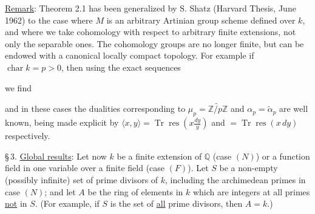 \uline{Remark}: Theorem 2.1 has been generalized by S. Shatz (Harvard Thesis, June 1962) to the case where $M$ is an arbitrary Artinian  group scheme defined over $k$, and where we take cohomology with respect to arbitrary finite extensions, not only the separable ones.  The cohomology groups are no longer finite, but can be endowed with a canonical locally compact topology. For example if $\operatorname{char}k=p>0$, then using the exact sequences


we find
\diagram{\[\begin{array}{lll}
H^0(k,\mu_p)=0&H^0(k,\alpha_p)=0&H^0(k,\mathbb Z/p\mathbb Z)=\mathbb Z/p\mathbb Z\\
H^1(k,\mu_p)=k^*/k^{*p}\ \text{(compact)}&
H^1(k,\alpha_p)=k/k^p\ \text{(locally compact)}&
H^1(k,\mathbb Z/p\mathbb Z)=k/\wp k\ \text{(discrete)}\\
H^2(k,\mu_p)=\frac1p\mathbb Z/\mathbb Z&H^2(k,\alpha_p)=0&H^2(k,\mathbb Z/p\mathbb Z)=0
\end{array}\]}

and in these cases the dualities corresponding to $\mu_p=\widetilde{\mathbb Z/p\mathbb Z}$ and $\alpha_p=\widetilde\alpha_p$ are well known, being made explicit by $\langle x,y\rangle=\operatorname{Tr}\operatorname{res}(x\frac{dy}{y})$ and $=\operatorname{Tr}\operatorname{res}(x\,dy)$ respectively.

\S\,3. \uline{Global results}: Let now $k$ be a finite extension of $\mathbb Q$ (case $(N)$) or a function field in one variable over a finite field (case $(F)$). Let $S$ be a non-empty (possibly infinite) set of prime divisors of $k$, including the archimedean primes in case $(N)$; and let $A$ be the ring of elements in $k$ which are integers at all primes \uline{not} in $S$. (For example, if $S$ is the set of \uline{all} prime divisors, then $A=k$.)

